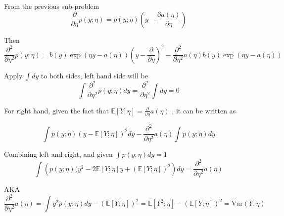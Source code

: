 \begin{answer}

From the previous sub-problem
\begin{equation*}
\frac{\partial}{\partial \eta} p(y; \eta) = p(y; \eta) \left( y - \frac{\partial a(\eta)}{\partial \eta} \right) 
\end{equation*}

Then
\begin{equation*}
\frac{\partial^2}{\partial \eta^2} p(y; \eta) = b(y)\exp(\eta y - a(\eta))(y - \frac{\partial}{\partial \eta})^2 -\frac{\partial^2}{\partial \eta^2} a(\eta) b(y)\exp(\eta y - a(\eta))
\end{equation*}

Apply $\int dy$ to both sides, left hand side will be 
\begin{equation*}
    \int \frac{\partial^2}{\partial \eta^2} p(y; \eta) dy = \frac{\partial^2}{\partial \eta^2} \int dy = 0
\end{equation*}

For right hand, given the fact that $\mathbb{E}[Y; \eta] = \frac{\partial}{\partial\eta}a(\eta)$ , it can be written as 

\begin{equation*}
    \int p(y; \eta)(y - \mathbb{E}[Y; \eta])^2 dy - \frac{\partial^2}{\partial \eta^2} a(\eta) \int p(y; \eta) dy
\end{equation*}

Combining left and right, and given $\int p(y; \eta) dy = 1$
\begin{equation*}
    \int \left( p(y; \eta)(y^2 - 2\mathbb{E}[Y; \eta] y + (\mathbb{E}[Y; \eta])^2 \right)dy = \frac{\partial^2}{\partial \eta^2} a(\eta)
\end{equation*}

AKA
\begin{equation*}
    \frac{\partial^2}{\partial \eta^2} a(\eta) = \int y^2 p(y; \eta)dy - (\mathbb{E}[Y; \eta])^2 = \mathbb{E}[Y^{2}; \eta] - (\mathbb{E}[Y; \eta])^2 = \text{Var}(Y; \eta)
\end{equation*}
\end{answer}


